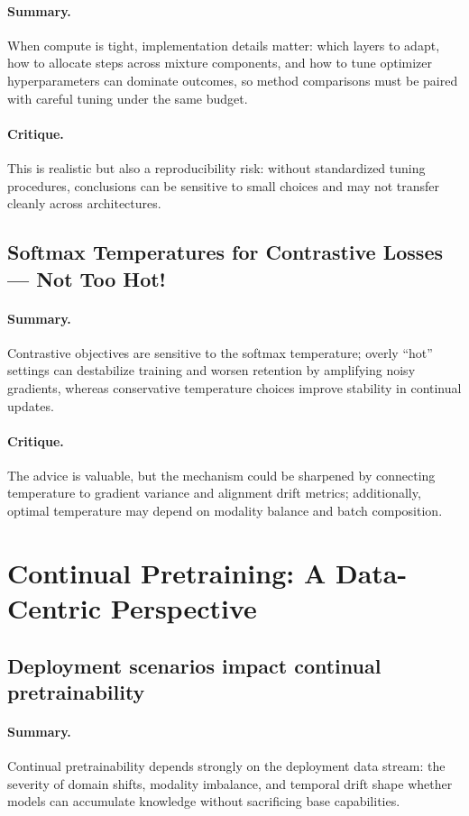 \documentclass[12pt]{article}
\begin{document}
\paragraph{Summary.} When compute is tight, implementation details matter: which layers to adapt, how to
allocate steps across mixture components, and how to tune optimizer hyperparameters can dominate outcomes, so
method comparisons must be paired with careful tuning under the same budget.
\paragraph{Critique.} This is realistic but also a reproducibility risk: without standardized tuning
procedures, conclusions can be sensitive to small choices and may not transfer cleanly across architectures.

\subsection{Softmax Temperatures for Contrastive Losses --- Not Too Hot!}
\paragraph{Summary.} Contrastive objectives are sensitive to the softmax temperature; overly “hot” settings
can destabilize training and worsen retention by amplifying noisy gradients, whereas conservative temperature
choices improve stability in continual updates.
\paragraph{Critique.} The advice is valuable, but the mechanism could be sharpened by connecting temperature
to gradient variance and alignment drift metrics; additionally, optimal temperature may depend on modality
balance and batch composition.

\section{Continual Pretraining: A Data-Centric Perspective}
\subsection{Deployment scenarios impact continual pretrainability}
\paragraph{Summary.} Continual pretrainability depends strongly on the deployment data stream: the severity
of domain shifts, modality imbalance, and temporal drift shape whether models can accumulate knowledge
without sacrificing base capabilities.
\end{document}
